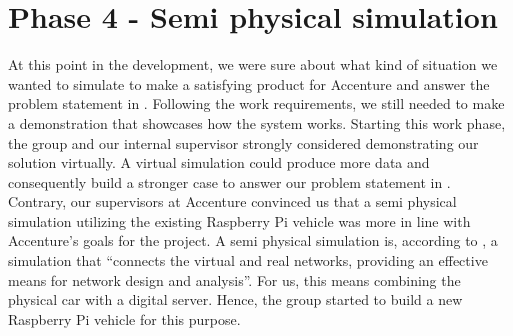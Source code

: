 \section{Phase 4 - Semi physical simulation}
At this point in the development, we were sure about what kind of situation we wanted to simulate to make a satisfying product for Accenture and answer the problem statement in . Following the work requirements, we still needed to make a demonstration that showcases how the system works. Starting this work phase, the group and our internal supervisor strongly considered demonstrating our solution virtually. A virtual simulation could produce more data and consequently build a stronger case to answer our problem statement in . Contrary, our supervisors at Accenture convinced us that a semi physical simulation utilizing the existing Raspberry Pi vehicle was more in line with Accenture's goals for the project. A semi physical simulation is, according to \cite{Chen2019}, a simulation that ``connects the virtual and real networks, providing an effective means for network design and analysis''. For us, this means combining the physical car with a digital server. Hence, the group started to build a new Raspberry Pi vehicle for this purpose.




\clearpage
%
%

